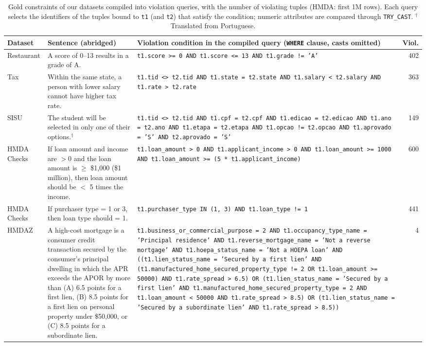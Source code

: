 \begin{table}[t]
  \centering
  \footnotesize
  \setlength{\tabcolsep}{4pt}
  \begin{tabular}{>{\raggedright\arraybackslash}p{1.6cm}>{\raggedright\arraybackslash}p{4.6cm}>{\raggedright\arraybackslash}p{9.0cm}r}
    \toprule
    \textbf{Dataset} & \textbf{Sentence (abridged)} & \textbf{Violation condition in the compiled query (\texttt{WHERE} clause, casts omitted)} & \textbf{Viol.} \\
    \midrule
    Restaurant & A score of 0--13 results in a grade of A. & \texttt{t1.score >= 0 AND t1.score <= 13 AND t1.grade != 'A'} & 402 \\
    Tax & Within the same state, a person with lower salary cannot have higher tax rate. & \texttt{t1.tid <> t2.tid AND t1.state = t2.state AND t1.salary < t2.salary AND t1.rate > t2.rate} & 363 \\
    SISU & The student will be selected in only one of their options.$^{\dagger}$ & \texttt{t1.tid <> t2.tid AND t1.cpf = t2.cpf AND t1.edicao = t2.edicao AND t1.ano = t2.ano AND t1.etapa = t2.etapa AND t1.opcao != t2.opcao AND t1.aprovado = 'S' AND t2.aprovado = 'S'} & 149 \\
    HMDA Checks & If loan amount and income are $>0$ and the loan amount is $\geq$ \$1,000 (\$1 million), then loan amount should be $<$ 5 times the income. & \texttt{t1.loan\_amount > 0 AND t1.applicant\_income > 0 AND t1.loan\_amount >= 1000 AND t1.loan\_amount >= (5 * t1.applicant\_income)} & 600 \\
    HMDA Checks & If purchaser type = 1 or 3, then loan type should = 1. & \texttt{t1.purchaser\_type IN (1, 3) AND t1.loan\_type != 1} & 441 \\
    HMDAZ & A high-cost mortgage is a consumer credit transaction secured by the consumer's principal dwelling in which the APR exceeds the APOR by more than (A) 6.5 points for a first lien, (B) 8.5 points for a first lien on personal property under \$50,000, or (C) 8.5 points for a subordinate lien. & \texttt{t1.business\_or\_commercial\_purpose = 2 AND t1.occupancy\_type\_name = 'Principal residence' AND t1.reverse\_mortgage\_name = 'Not a reverse mortgage' AND t1.hoepa\_status\_name = 'Not a HOEPA loan' AND ((t1.lien\_status\_name = 'Secured by a first lien' AND (t1.manufactured\_home\_secured\_property\_type != 2 OR t1.loan\_amount >= 50000) AND t1.rate\_spread > 6.5) OR (t1.lien\_status\_name = 'Secured by a first lien' AND t1.manufactured\_home\_secured\_property\_type = 2 AND t1.loan\_amount < 50000 AND t1.rate\_spread > 8.5) OR (t1.lien\_status\_name = 'Secured by a subordinate lien' AND t1.rate\_spread > 8.5))} & 4 \\
    \bottomrule
  \end{tabular}
  \caption{Gold constraints of our datasets compiled into violation queries, with the number of violating tuples (HMDA: first 1M rows). Each query selects the identifiers of the tuples bound to \texttt{t1} (and \texttt{t2}) that satisfy the condition; numeric attributes are compared through \texttt{TRY\_CAST}. $^{\dagger}$Translated from Portuguese.}
  \label{tab:sql-examples}
\end{table}



